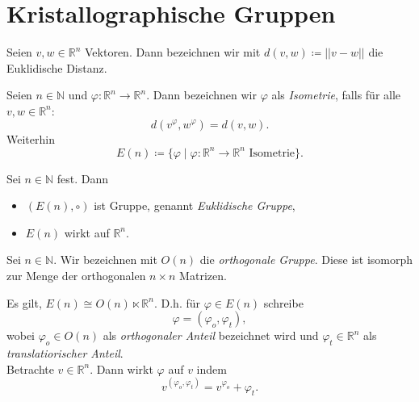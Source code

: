\documentclass{beamer}
\theoremstyle{plain}
\newcommand\R{\mathbb R}
\newcommand\N{\mathbb N}
\renewcommand{\phi}{\varphi}
\begin{document}
\section{Kristallographische Gruppen}
\begin{frame}
    \begin{notation}
        Seien $v, w \in \R^n$ Vektoren. \pause 
        Dann bezeichnen wir mit $d(v, w) \coloneqq ||v - w ||$ die Euklidische Distanz.
    \end{notation}
    \pause
    \begin{definition}
        Seien $n \in \N$ und $\phi: \R^n \to \R^n$. Dann bezeichnen wir $\phi$ als \emph{Isometrie}, falls für alle $v, w \in \R^n$:
        $$
            d(v^\phi, w^\phi) = d(v, w).
        $$\pause
        Weiterhin
        $$
            E(n) \coloneqq \{ \phi \mid \phi : \R^n \to \R^n \text{ Isometrie} \}.
        $$
    \end{definition}
\end{frame}

\begin{frame}
    \begin{remark}
        Sei $n \in \N$ fest. Dann
        \begin{itemize}[label=\textbullet]
            \item $(E(n), \circ)$ ist Gruppe, genannt \emph{Euklidische Gruppe},
            \item $E(n)$ wirkt auf $\R^n$.
        \end{itemize} 
    \end{remark}
    \pause
    \begin{notation}
        Sei $n \in \N$. Wir bezeichnen mit $O(n)$ die \emph{orthogonale Gruppe}. Diese ist isomorph zur Menge der orthogonalen $n \times n$ Matrizen.  
    \end{notation}
    
    
\end{frame}

\begin{frame}
    Es gilt, $E(n) \cong O(n) \ltimes \R^n$. D.h. für $\phi \in E(n)$ schreibe
    $$
        \phi = (\phi_o, \phi_t),
    $$
    wobei $\phi_o \in O(n)$ als \emph{orthogonaler Anteil} bezeichnet wird und $\phi_t \in \R^n$ als \emph{translatiorischer Anteil}. \\ \pause
    Betrachte $v \in \R^n$. Dann wirkt $\phi$ auf $v$ indem
    $$
        v^{(\phi_o, \phi_t)} = v^{\phi_o} + \phi_t.
    $$
\end{frame}
\end{document}

